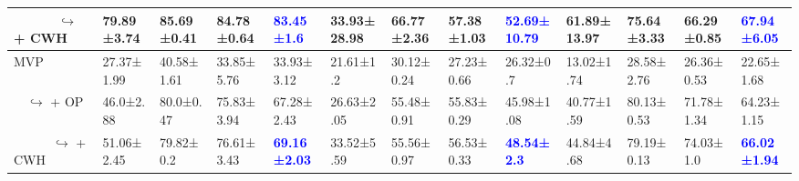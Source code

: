 \begin{table*}[htbp]
{\begin{tabular}{l|llla|llla|llla}
\ \ \ \ \ \ $\hookrightarrow$ + CWH          & 79.89{\scriptsize±3.74} & 85.69{\scriptsize±0.41} & 84.78{\scriptsize±0.64} & \textbf{\textcolor{blue}{83.45{\scriptsize±1.6}}} & 33.93{\scriptsize±28.98} & 66.77{\scriptsize±2.36} & 57.38{\scriptsize±1.03} & \textbf{\textcolor{blue}{52.69{\scriptsize±10.79}}} & 61.89{\scriptsize±13.97} & 75.64{\scriptsize±3.33} & 66.29{\scriptsize±0.85} & \textbf{\textcolor{blue}{67.94{\scriptsize±6.05}}} \\
\hline
MVP                                         & 27.37{\scriptsize±1.99} & 40.58{\scriptsize±1.61} & 33.85{\scriptsize±5.76} & 33.93{\scriptsize±3.12} & 21.61{\scriptsize±1.2} & 30.12{\scriptsize±0.24} & 27.23{\scriptsize±0.66} & 26.32{\scriptsize±0.7} & 13.02{\scriptsize±1.74} & 28.58{\scriptsize±2.76} & 26.36{\scriptsize±0.53} & 22.65{\scriptsize±1.68} \\
\ \  $\hookrightarrow$ + OP                 & 46.0{\scriptsize±2.88} & 80.0{\scriptsize±0.47} & 75.83{\scriptsize±3.94} & 67.28{\scriptsize±2.43} & 26.63{\scriptsize±2.05} & 55.48{\scriptsize±0.91} & 55.83{\scriptsize±0.29} & 45.98{\scriptsize±1.08} & 40.77{\scriptsize±1.59} & 80.13{\scriptsize±0.53} & 71.78{\scriptsize±1.34} & 64.23{\scriptsize±1.15} \\
\ \ \ \ \ \ $\hookrightarrow$ + CWH          & 51.06{\scriptsize±2.45} & 79.82{\scriptsize±0.2} & 76.61{\scriptsize±3.43} & \textbf{\textcolor{blue}{69.16{\scriptsize±2.03}}} & 33.52{\scriptsize±5.59} & 55.56{\scriptsize±0.97} & 56.53{\scriptsize±0.33} & \textbf{\textcolor{blue}{48.54{\scriptsize±2.3}}} & 44.84{\scriptsize±4.68} & 79.19{\scriptsize±0.13} & 74.03{\scriptsize±1.0} & \textbf{\textcolor{blue}{66.02{\scriptsize±1.94}}} \\
\bottomrule
    \end{tabular}
    \label{tab:clear_total}}
\end{table*}
